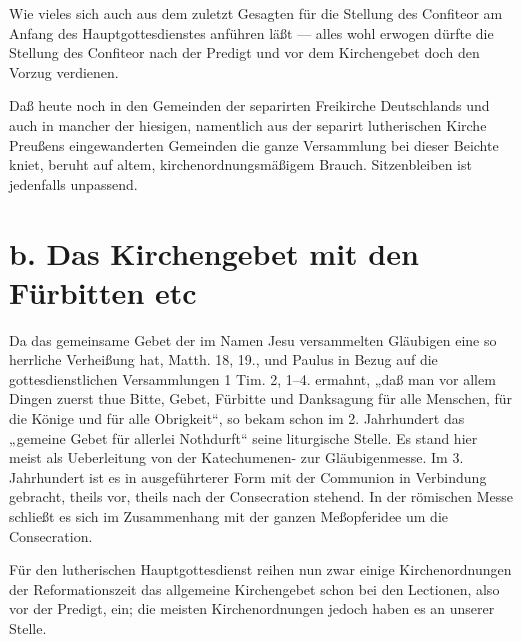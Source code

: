 Wie vieles sich auch aus dem zuletzt Gesagten für die Stellung des Confiteor am Anfang des Hauptgottesdienstes anführen läßt — alles wohl erwogen dürfte die Stellung des Confiteor nach der Predigt und vor dem Kirchengebet doch den Vorzug verdienen.

Daß heute noch in den Gemeinden der separirten Freikirche Deutschlands und auch in mancher der hiesigen, namentlich aus der separirt lutherischen Kirche Preußens eingewanderten Gemeinden die ganze Versammlung bei dieser Beichte kniet, beruht auf altem, kirchenordnungsmäßigem Brauch. Sitzenbleiben ist jedenfalls unpassend.

\section[b. Das Kirchengebet]{b. Das Kirchengebet mit den Fürbitten etc}

Da das gemeinsame Gebet der im Namen Jesu versammelten Gläubigen eine so herrliche Verheißung hat, Matth. 18, 19., und Paulus in Bezug auf die gottesdienstlichen Versammlungen 1 Tim. 2, 1–4. ermahnt, „daß man vor allem Dingen zuerst thue Bitte, Gebet, Fürbitte und Danksagung für alle Menschen, für die Könige und für alle Obrigkeit“, so bekam schon im 2. Jahrhundert das „gemeine Gebet für allerlei Nothdurft“ seine liturgische Stelle. Es stand hier meist als Ueberleitung von der Katechumenen- zur Gläubigenmesse. Im 3. Jahrhundert ist es in ausgeführterer Form mit der Communion in Verbindung gebracht, theils vor, theils nach der Consecration stehend. In der römischen Messe schließt es sich im Zusammenhang mit der ganzen Meßopferidee um die Consecration.

Für den lutherischen Hauptgottesdienst reihen nun zwar einige Kirchenordnungen der Reformationszeit das allgemeine Kirchengebet schon bei den Lectionen, also vor der Predigt, ein; die meisten Kirchenordnungen jedoch haben es an unserer Stelle.

